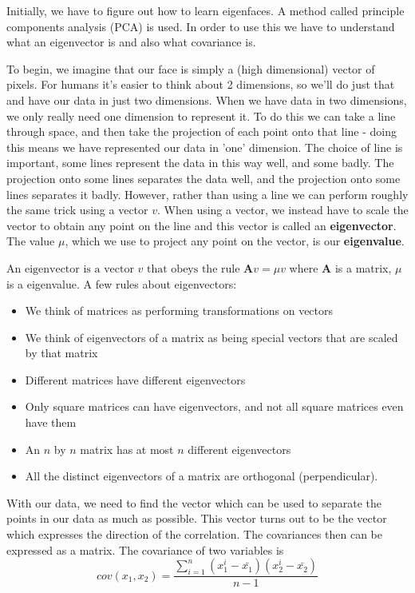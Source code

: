\documentclass{article}
\begin{document}
	Initially, we have to figure out how to learn eigenfaces. A method called principle components analysis (PCA) is used. In order to use this we have to understand what an eigenvector is and also what covariance is.
	
	To begin, we imagine that our face is simply a (high dimensional) vector of pixels. For humans it's easier to think about 2 dimensions, so we'll do just that and have our data in just two dimensions. When we have data in two dimensions, we only really need one dimension to represent it. To do this we can take a line through space, and then take the projection of each point onto that line - doing this means we have represented our data in 'one' dimension. The choice of line is important, some lines represent the data in this way well, and some badly. The projection onto some lines separates the data well, and the projection onto some lines separates it badly. However, rather than using a line we can perform roughly the same trick using a vector $v$. When using a vector, we instead have to scale the vector to obtain any point on the line and this vector is called an \textbf{eigenvector}. The value $\mu$, which we use to project any point on the vector, is our \textbf{eigenvalue}.
	
		$\text{An eigenvector is a vector } v \text{ that obeys the rule } \mathbf{A}v = \mu v$ where $\mathbf{A}$ is a matrix, $\mu$ is a eigenvalue. A few rules about eigenvectors:
		\begin{itemize}
			\item We think of matrices as performing transformations on vectors
			\item We think of eigenvectors of a matrix as being special vectors that are scaled by that matrix
			\item Different matrices have different eigenvectors
			\item Only square matrices can have eigenvectors, and not all square matrices even have them
			\item An $n$ by $n$ matrix has at most $n$ different eigenvectors
			\item All the distinct eigenvectors of a matrix are orthogonal (perpendicular).
		\end{itemize}
		
	With our data, we need to find the vector which can be used to separate the points in our data as much as possible. This vector turns out to be the vector which expresses the direction of the correlation. The covariances then can be expressed as a matrix. The covariance of two variables is
	\[ cov(x_{1}, x_{2}) = \frac{\sum_{i=1}^{n}(x_{1}^{i} - \bar{x_{1}})(x_{2}^{i} - \bar{x_{2}})}{n - 1} \]	
	
\end{document}
